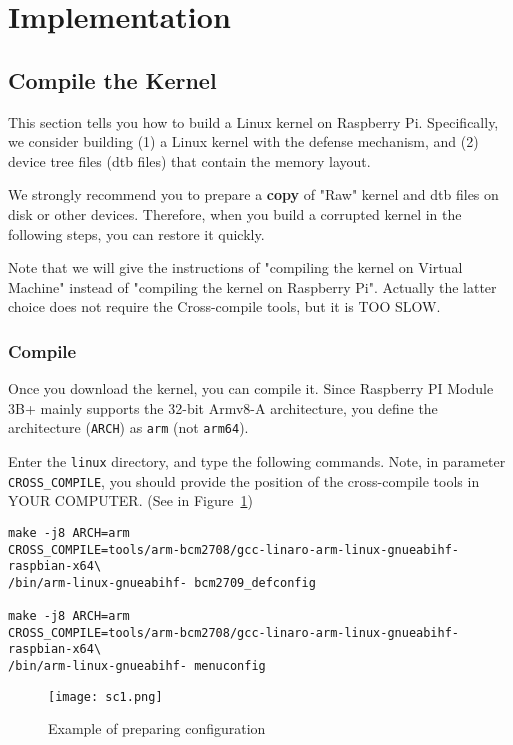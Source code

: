 \section{Implementation}
\label{sec:impl}


\subsection{Compile the Kernel}
This section tells you how to build a Linux kernel on Raspberry Pi. Specifically, we consider building (1) a Linux kernel with the defense mechanism, and (2) device tree files (dtb files) that contain the memory layout.

We strongly recommend you to prepare a \textbf{copy} of "Raw" kernel and dtb files on disk or other devices. Therefore, when you build a corrupted kernel in the following steps, you can restore it quickly.

Note that we will give the instructions of "compiling the kernel on Virtual Machine" instead of "compiling the kernel on Raspberry Pi". Actually the latter choice does not require the Cross-compile tools, but it is TOO SLOW.

\subsubsection{Compile}

Once you download the kernel, you can compile it.  Since Raspberry PI 
Module 3B+ mainly supports the 32-bit Armv8-A architecture, 
you define the architecture (\texttt{ARCH}) as \texttt{arm} (not 
\texttt{arm64}).

Enter the \texttt{linux} directory, and type the following commands.
Note, in parameter \texttt{CROSS\_COMPILE}, you 
should provide the position of the cross-compile tools in YOUR 
COMPUTER. (See in Figure~\ref{fig:sc1})




\begin{lstlisting}
make -j8 ARCH=arm 
CROSS_COMPILE=tools/arm-bcm2708/gcc-linaro-arm-linux-gnueabihf-raspbian-x64\
/bin/arm-linux-gnueabihf- bcm2709_defconfig

make -j8 ARCH=arm 
CROSS_COMPILE=tools/arm-bcm2708/gcc-linaro-arm-linux-gnueabihf-raspbian-x64\
/bin/arm-linux-gnueabihf- menuconfig
\end{lstlisting}

\begin{figure}[H]
	\centering
	\texttt{[image: sc1.png]}
	\caption{Example of preparing configuration}
	\label{fig:sc1}
\end{figure}

